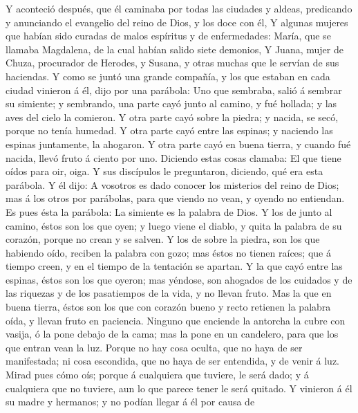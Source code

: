 Y aconteció después, que él caminaba por todas las ciudades
y aldeas, predicando y anunciando el evangelio del reino de Dios, y los
doce con él,  Y algunas mujeres que habían sido curadas de
malos espíritus y de enfermedades: María, que se llamaba Magdalena, de
la cual habían salido siete demonios,  Y Juana, mujer de
Chuza, procurador de Herodes, y Susana, y otras muchas que le servían de
sus haciendas.  Y como se juntó una grande compañía, y los
que estaban en cada ciudad vinieron á él, dijo por una parábola:
 Uno que sembraba, salió á sembrar su simiente; y sembrando,
una parte cayó junto al camino, y fué hollada; y las aves del cielo la
comieron.  Y otra parte cayó sobre la piedra; y nacida, se
secó, porque no tenía humedad.  Y otra parte cayó entre las
espinas; y naciendo las espinas juntamente, la ahogaron.  Y
otra parte cayó en buena tierra, y cuando fué nacida, llevó fruto á
ciento por uno. Diciendo estas cosas clamaba: El que tiene oídos para
oir, oiga.  Y sus discípulos le preguntaron, diciendo, qué
era esta parábola.  Y él dijo: A vosotros es dado conocer
los misterios del reino de Dios; mas á los otros por parábolas, para que
viendo no vean, y oyendo no entiendan.  Es pues ésta la
parábola: La simiente es la palabra de Dios.  Y los de
junto al camino, éstos son los que oyen; y luego viene el diablo, y
quita la palabra de su corazón, porque no crean y se salven.
 Y los de sobre la piedra, son los que habiendo oído,
reciben la palabra con gozo; mas éstos no tienen raíces; que á tiempo
creen, y en el tiempo de la tentación se apartan.  Y la que
cayó entre las espinas, éstos son los que oyeron; mas yéndose, son
ahogados de los cuidados y de las riquezas y de los pasatiempos de la
vida, y no llevan fruto.  Mas la que en buena tierra, éstos
son los que con corazón bueno y recto retienen la palabra oída, y llevan
fruto en paciencia.  Ninguno que enciende la antorcha la
cubre con vasija, ó la pone debajo de la cama; mas la pone en un
candelero, para que los que entran vean la luz.  Porque no
hay cosa oculta, que no haya de ser manifestada; ni cosa escondida, que
no haya de ser entendida, y de venir á luz.  Mirad pues
cómo oís; porque á cualquiera que tuviere, le será dado; y á cualquiera
que no tuviere, aun lo que parece tener le será quitado.  Y
vinieron á él su madre y hermanos; y no podían llegar á él por causa de
